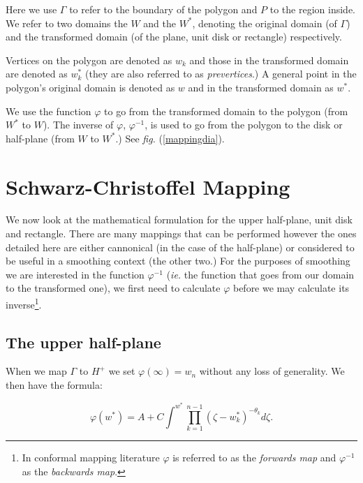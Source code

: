\documentclass[a4paper,10pt]{amsart}
\newcommand{\sch}{Schwarz-Christoffel }
\newcommand{\fig}[1]{\emph{fig.} (\ref{#1})}
\renewcommand{\phi}{\varphi}
\begin{document}
Here we use $\Gamma$ to refer to the boundary of the polygon and $P$ to the region inside. We refer to two domains the $W$ and the $W^*$, denoting the original domain (of $\Gamma$) and the transformed domain (of the plane, unit disk or rectangle) respectively. 

Vertices on the polygon are denoted as $w_k$ and those in the transformed domain are denoted as $w^*_k$ (they are also referred to as \emph{prevertices}.) A general point in the polygon's original domain is denoted as $w$ and in the transformed domain as $w^*$.

We use the function $\phi$ to go from the transformed domain to the polygon (from $W^*$ to $W$). The inverse of $\phi$, $\phi^{-1}$, is used to go from the polygon to the disk or half-plane (from $W$ to $W^*$.)  See \fig{mappingdia}.






\section{\sch Mapping}

We now look at the mathematical formulation for the upper half-plane, unit disk and rectangle. There are many mappings that can be performed however the ones detailed here are either cannonical (in the case of the half-plane) or considered to be useful in a smoothing context (the other two.) For the purposes of smoothing we are interested in the function $\phi^{-1}$ (\emph{ie.} the function that goes from our domain to the transformed one), we first need to calculate $\phi$ before we may calculate its inverse\footnote{In conformal mapping literature $\phi$ is referred to as the \emph{forwards map} and $\phi^{-1}$ as the \emph{backwards map}.}.

\subsection{The upper half-plane}

When we map $\Gamma$ to $H^+$ we set $\phi(\infty) = w_n$ without any loss of generality. We then have the formula:

\begin{equation}
\phi(w^*) = A + C \int^{w^*} \prod_{k=1}^{n-1} (\zeta-w^*_k)^{-\theta_k} d\zeta.
\end{equation}
\end{document}
